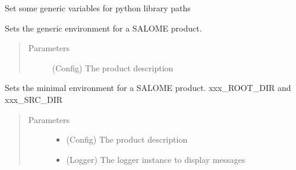 \documentclass[a4paper,10pt,english]{sphinxmanual}
\begin{document}
\begin{fulllineitems}
\begin{fulllineitems}
\end{fulllineitems}


\begin{fulllineitems}
\label{\detokenize{apidoc_src/src:src.environment.SalomeEnviron.set_python_libdirs}}
Set some generic variables for python library paths

\end{fulllineitems}


\begin{fulllineitems}
\label{\detokenize{apidoc_src/src:src.environment.SalomeEnviron.set_salome_generic_product_env}}
Sets the generic environment for a SALOME product.
\begin{quote}\begin{description}
\item[{Parameters}] \leavevmode
{} \textendash{} (Config) The product description

\end{description}\end{quote}

\end{fulllineitems}


\begin{fulllineitems}
\label{\detokenize{apidoc_src/src:src.environment.SalomeEnviron.set_salome_minimal_product_env}}
Sets the minimal environment for a SALOME product.
xxx\_ROOT\_DIR and xxx\_SRC\_DIR
\begin{quote}\begin{description}
\item[{Parameters}] \leavevmode\begin{itemize}
\item {} 
 \textendash{} (Config) The product description

\item {} 
 \textendash{} (Logger) The logger instance to display messages

\end{itemize}

\end{description}\end{quote}

\end{fulllineitems}


\end{fulllineitems}
\end{document}
